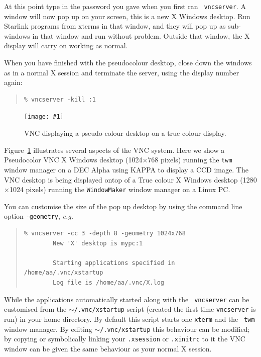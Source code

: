 \documentclass[twoside,11pt]{article}
\newcommand{\htmladdimg}[1]{}
\newcommand{\xref}[3]{#1}
\newcommand{\myfig}[5]{
  \begin{figure}
    \centering\texttt{[image: \#1]}
    \typeout{#1 inserted on page \arabic{page}}
    \caption{\label{#4}#5}
  \end{figure}
  }
\newcommand{\myfig}[5]{
    \label{#4} \htmladdimg{#3}\\
    Figure: #5\\
  }
\begin{document}
At this point type in the password you gave when you first ran {\tt
vncserver}. A window will now pop up on your screen, this is a new X
Windows desktop. Run Starlink programs from xterms in that window, and
they will pop up as sub-windows in that window and run without
problem. Outside that window, the X display will carry on working as
normal. 

When you have finished with the pseudocolour desktop, close down the
windows as in a normal X session and terminate the server, using the
display number again: 

\small
\begin{quote}
\begin{verbatim}
% vncserver -kill :1    
\end{verbatim}
\end{quote}
\normalsize   
 \myfig{sc15_vnc.eps}{height=0.45\textheight}{sc15_vnc.gif}{sc15_vnc_example1}{VNC displaying a pseudo colour desktop on a true colour display.}
 
Figure~\ref{sc15_vnc_example1} illustrates several aspects of the VNC
system. Here we show a Pseudocolor VNC X Windows desktop
(1024$\times$768 pixels) running the {\tt twm} window manager on a DEC
Alpha using \xref{KAPPA}{sun95}{} to display a CCD image. The VNC
desktop is being displayed ontop of a True colour X Windows desktop
(1280$\times$1024 pixels) running the {\tt WindowMaker} window manager
on a Linux PC.

You can customise the size of the pop up desktop by using the command
line option {\tt -geometry}, {\em e.g.\ } 

\small
\begin{quote}
\begin{verbatim}
% vncserver -cc 3 -depth 8 -geometry 1024x768
        New 'X' desktop is mypc:1

        Starting applications specified in /home/aa/.vnc/xstartup
        Log file is /home/aa/.vnc/X.log
\end{verbatim}
\end{quote}
\normalsize

While the applications automatically started along with the {\tt
vncserver} can be customised from the {\tt $\sim$/.vnc/xstartup}
script (created the first time {\tt vncserver} is run) in your home
directory. By default this script starts one {\tt xterm} and the {\tt
twm} window manager. By editing {\tt $\sim$/.vnc/xstartup} this
behaviour can be modified; by copying or symbolically linking your
{\tt .xsession} or {\tt .xinitrc} to it the VNC window can be given
the same behaviour as your normal X session.
\end{document}
